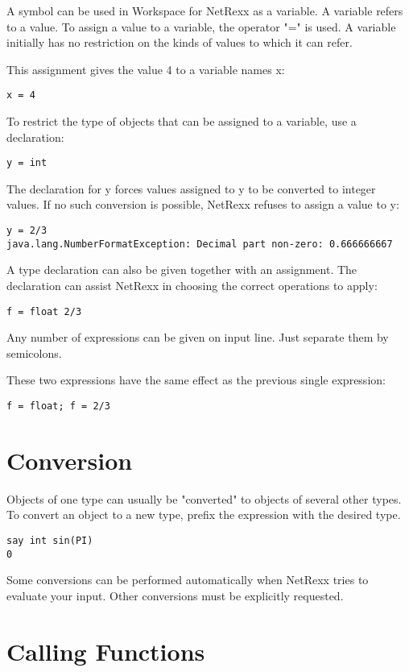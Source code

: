 A symbol can be used in Workspace for NetRexx as a variable. A variable refers to a value. To assign a value to a variable, the operator "=" is used. A variable initially has no restriction on the kinds of values to which it can refer.

This assignment gives the value 4 to a variable names x:
\begin{verbatim}
x = 4
\end{verbatim}
To restrict the type of objects that can be assigned to a variable, use a declaration:

\begin{verbatim}
y = int
\end{verbatim}
The declaration for y forces values assigned to y to be converted to integer values. If no such conversion is possible, NetRexx refuses to assign a value to y:

\begin{verbatim}
y = 2/3
java.lang.NumberFormatException: Decimal part non-zero: 0.666666667
\end{verbatim}
A type declaration can also be given together with an assignment. The declaration can assist NetRexx in choosing the correct operations to apply:

\begin{verbatim}
f = float 2/3
\end{verbatim}
Any number of expressions can be given on input line. Just separate them by semicolons.

These two expressions have the same effect as the previous single expression:

\begin{verbatim}
f = float; f = 2/3
\end{verbatim}
 \section{Conversion}

Objects of one type can usually be "converted" to objects of several other types. To convert an object to a new type, prefix the expression with the desired type.
\begin{verbatim}
say int sin(PI)
0
\end{verbatim}
Some conversions can be performed automatically when NetRexx tries to evaluate your input. Other conversions must be explicitly requested.

\section{Calling Functions}

